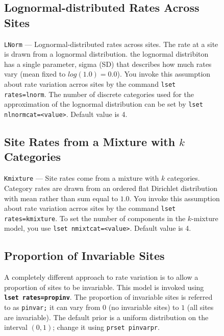 \documentclass[12pt]{book}
\newcommand{\ttt}[1]{\texttt{#1}}
\newcommand{\tb}[1]{\ttt{\textbf{#1}}}
\begin{document}
\begin{figure}[h]
\subsection{Lognormal-distributed Rates Across Sites}

\ttt{LNorm} --- Lognormal-distributed rates across sites. The rate at a site is drawn from a
lognormal distribution. the lognormal distribiton has a single parameter, sigma (SD) that describes
how much rates vary (mean fixed to $log(1.0) = 0.0$). You invoke this assumption about rate
variation acrros sites by the command \ttt{lset rates=lnorm}. The number of discrete categories
used for the approximation of the lognormal distribution can be set by \ttt{lset
nlnormcat=<value>}. Default value is 4.

\subsection{Site Rates from a Mixture with $k$ Categories}

\ttt{Kmixture} --- Site rates come from a mixture with $k$ categories. Category rates are drawn
from an ordered flat Dirichlet distribution with mean rather than sum equal to $1.0$. You invoke
this assumption about rate variation acrros sites by the command \ttt{lset rates=kmixture}. To set
the number of components in the $k$-mixture model, you use \ttt{lset nmixtcat=<value>}. Default
value is 4.

\subsection{Proportion of Invariable Sites}

A completely different approach to rate variation is to allow a proportion of sites to be
invariable. This model is invoked using \tb{lset rates=propinv}. The proportion of invariable sites
is referred to as \ttt{pinvar;} it can vary from $0$ (no invariable sites) to $1$ (all sites are
invariable). The default prior is a uniform distribution on the interval $(0,1)$; change it using
\ttt{prset pinvarpr}.


\end{figure}
\end{document}
